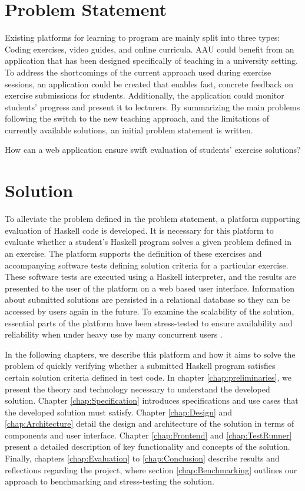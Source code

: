 \section{Problem Statement}
Existing platforms for learning to program are mainly split into three types: Coding exercises, video guides, and online curricula.
AAU could benefit from an application that has been designed specifically of teaching in a university setting.
To address the shortcomings of the current approach used during exercise sessions, an application could be created that enables fast, concrete feedback on exercise submissions for students. Additionally, the application could monitor students' progress and present it to lecturers.
By summarizing the main problems following the switch to the new teaching approach, and the limitations of currently available solutions, an initial problem statement is written.
\begin{displayquote}
    How can a web application ensure swift evaluation of students' exercise solutions?
\end{displayquote}

\section{Solution}
To alleviate the problem defined in the problem statement, a platform supporting evaluation of Haskell code is developed. It is necessary for this platform to evaluate whether a student's Haskell program solves a given problem defined in an exercise. The platform supports the definition of these exercises and accompanying software tests defining solution criteria for a particular exercise. These software tests are executed using a Haskell interpreter, and the results are presented to the user of the platform on a web based user interface.
Information about submitted solutions are persisted in a relational database so they can be accessed by users again in the future.
To examine the scalability of the solution, essential parts of the platform have been stress-tested to ensure availability and reliability when under heavy use by many concurrent users \cite{Sommerville10}.

In the following chapters, we describe this platform and how it aims to solve the problem of quickly verifying whether a submitted Haskell program satisfies certain solution criteria defined in test code.
In chapter \ref{chap:preliminaries}, we present the theory and technology necessary to understand the developed solution.
Chapter \ref{chap:Specification} introduces specifications and use cases that the developed solution must satisfy.
Chapter \ref{chap:Design} and \ref{chap:Architecture} detail the design and architecture of the solution in terms of components and user interface.
Chapter \ref{chap:Frontend} and \ref{chap:TestRunner} present a detailed description of key functionality and concepts of the solution.
Finally, chapters \ref{chap:Evaluation} to \ref{chap:Conclusion} describe results and reflections regarding the project, where section \ref{chap:Benchmarking} outlines our approach to benchmarking and stress-testing the solution.

